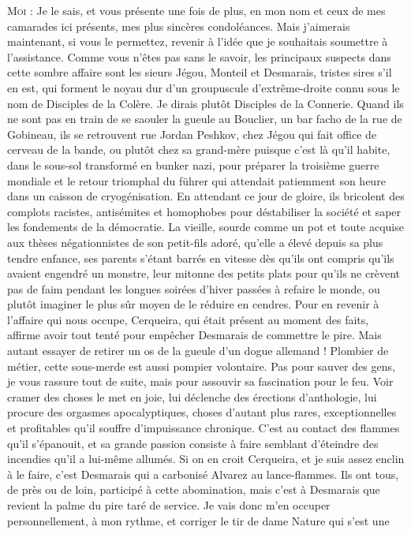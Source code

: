 \begin{dialogue}
%
%
%
\textsc{Moi} : Je le sais, et vous présente une fois de plus, en mon nom et ceux de mes camarades ici présents, mes plus sincères condoléances. Mais j’aimerais maintenant, si vous le permettez, revenir à l’idée que je souhaitais soumettre à l’assistance. Comme vous n’êtes pas sans le savoir, les principaux suspects dans cette sombre affaire sont les sieurs Jégou, Monteil et Desmarais, tristes sires s’il en est, qui forment le noyau dur d’un groupuscule d’extrême-droite connu sous le nom de Disciples de la Colère. Je dirais plutôt Disciples de la Connerie. Quand ils ne sont pas en train de se saouler la gueule au Bouclier, un bar facho de la rue de Gobineau, ils se retrouvent rue Jordan Peshkov, chez Jégou qui fait office de cerveau de la bande, ou plutôt chez sa grand-mère puisque c’est là qu’il habite, dans le sous-sol transformé en bunker nazi, pour préparer la troisième guerre mondiale et le retour triomphal du führer qui attendait patiemment son heure dans un caisson de cryogénisation. En attendant ce jour de gloire, ils bricolent des complots racistes, antisémites et homophobes pour déstabiliser la société et saper les fondements de la démocratie. La vieille, sourde comme un pot et toute acquise aux thèses négationnistes de son petit-fils adoré, qu’elle a élevé depuis sa plus tendre enfance, ses parents s’étant barrés en vitesse dès qu’ils ont compris qu’ils avaient engendré un monstre, leur mitonne des petits plats pour qu’ils ne crèvent pas de faim pendant les longues soirées d’hiver passées à refaire le monde, ou plutôt imaginer le plus sûr moyen de le réduire en cendres. Pour en revenir à l’affaire qui nous occupe, Cerqueira, qui était présent au moment des faits, affirme avoir tout tenté pour empêcher Desmarais de commettre le pire. Mais autant essayer de retirer un os de la gueule d’un dogue allemand ! Plombier de métier, cette sous-merde est aussi pompier volontaire. Pas pour sauver des gens, je vous rassure tout de suite, mais pour assouvir sa fascination pour le feu. Voir cramer des choses le met en joie, lui déclenche des érections d’anthologie, lui procure des orgasmes apocalyptiques, choses d’autant plus rares, exceptionnelles et profitables qu’il souffre d’impuissance chronique. C’est au contact des flammes qu’il s’épanouit, et sa grande passion consiste à faire semblant d’éteindre des incendies qu’il a lui-même allumés. Si on en croit Cerqueira, et je suis assez enclin à le faire, c’est Desmarais qui a carbonisé Alvarez au lance-flammes. Ils ont tous, de près ou de loin, participé à cette abomination, mais c’est à Desmarais que revient la palme du pire taré de service. Je vais donc m’en occuper personnellement, à mon rythme, et corriger le tir de dame Nature qui s’est une 
\end{dialogue}
